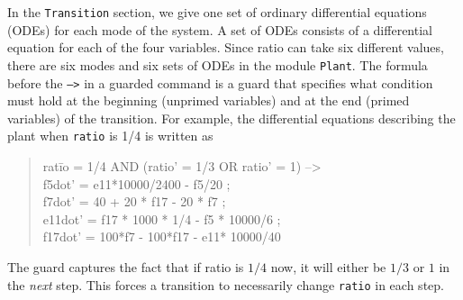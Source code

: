 \documentclass{llncs}
\begin{document}
In the {\tt{Transition}} section, we give one set of ordinary differential equations (ODEs)
for each mode of the system. A set of ODEs consists of a differential equation for each
of the four variables. Since ratio can take six different values, there are six modes
and six sets of ODEs in the module {\tt{Plant}}.
The formula before the {\tt{-->}} in a guarded command is a guard that specifies what
condition must hold at the beginning (unprimed variables) and at the end 
(primed variables) of the transition.
For example, the differential equations describing the plant when {\tt{ratio}} is 1/4 
is written as
\begin{quote}
\begin{tt}
\begin{tabbing}
rat\=io = 1/4 AND (ratio' = 1/3 OR ratio' = 1) -->
\+
\\ 
  f5dot' = e11*10000/2400 - f5/20 ;
\\
  f7dot' = 40 + 20 * f17 - 20 * f7 ;
\\
  e11dot' = f17 * 1000 * 1/4 - f5 * 10000/6 ;
\\
  f17dot' = 100*f7 - 100*f17 - e11* 10000/40
\end{tabbing}
\end{tt}
\end{quote}
The guard captures the fact that if ratio is $1/4$ now, it will either
be $1/3$ or $1$ in the {\em{next}} step.
This forces a transition to necessarily change {\tt{ratio}}
in each step.
\end{document}
